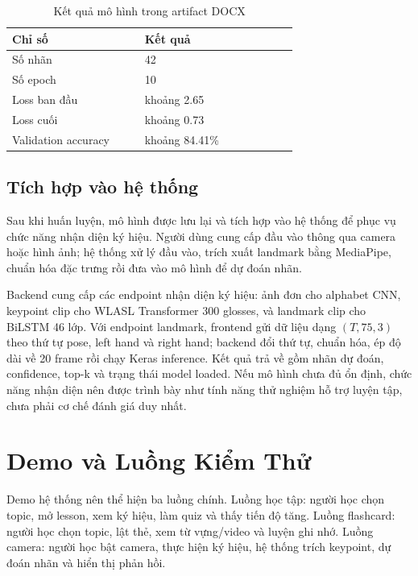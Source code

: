\documentclass[conference]{IEEEtran}
\begin{document}
\begin{table}[htbp]
\caption{Kết quả mô hình trong artifact DOCX}
\begin{center}
\footnotesize
\begin{tabular}{|p{0.38\linewidth}|p{0.44\linewidth}|}
\hline
\textbf{Chỉ số} & \textbf{Kết quả} \\
\hline
Số nhãn & 42 \\
\hline
Số epoch & 10 \\
\hline
Loss ban đầu & khoảng 2.65 \\
\hline
Loss cuối & khoảng 0.73 \\
\hline
Validation accuracy & khoảng 84.41\% \\
\hline
\end{tabular}
\label{tab:artifact-model}
\end{center}
\end{table}

\subsection{Tích hợp vào hệ thống}
Sau khi huấn luyện, mô hình được lưu lại và tích hợp vào hệ thống để phục vụ chức năng nhận diện ký hiệu. Người dùng cung cấp đầu vào thông qua camera hoặc hình ảnh; hệ thống xử lý đầu vào, trích xuất landmark bằng MediaPipe, chuẩn hóa đặc trưng rồi đưa vào mô hình để dự đoán nhãn.

Backend cung cấp các endpoint nhận diện ký hiệu: ảnh đơn cho alphabet CNN, keypoint clip cho WLASL Transformer 300 glosses, và landmark clip cho BiLSTM 46 lớp. Với endpoint landmark, frontend gửi dữ liệu dạng $(T,75,3)$ theo thứ tự pose, left hand và right hand; backend đổi thứ tự, chuẩn hóa, ép độ dài về 20 frame rồi chạy Keras inference. Kết quả trả về gồm nhãn dự đoán, confidence, top-k và trạng thái model loaded. Nếu mô hình chưa đủ ổn định, chức năng nhận diện nên được trình bày như tính năng thử nghiệm hỗ trợ luyện tập, chưa phải cơ chế đánh giá duy nhất.

\section{Demo và Luồng Kiểm Thử}
Demo hệ thống nên thể hiện ba luồng chính. Luồng học tập: người học chọn topic, mở lesson, xem ký hiệu, làm quiz và thấy tiến độ tăng. Luồng flashcard: người học chọn topic, lật thẻ, xem từ vựng/video và luyện ghi nhớ. Luồng camera: người học bật camera, thực hiện ký hiệu, hệ thống trích keypoint, dự đoán nhãn và hiển thị phản hồi.
\end{document}
